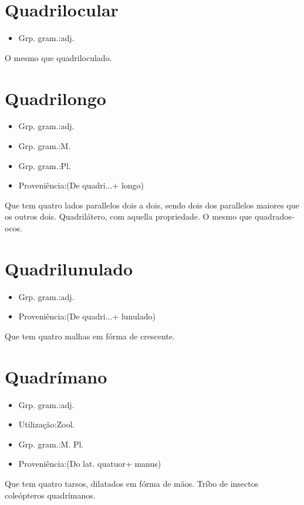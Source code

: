 \section{Quadrilocular}
\begin{itemize}
\item {Grp. gram.:adj.}
\end{itemize}
O mesmo que \textunderscore quadriloculado\textunderscore .
\section{Quadrilongo}
\begin{itemize}
\item {Grp. gram.:adj.}
\end{itemize}
\begin{itemize}
\item {Grp. gram.:M.}
\end{itemize}
\begin{itemize}
\item {Grp. gram.:Pl.}
\end{itemize}
\begin{itemize}
\item {Proveniência:(De \textunderscore quadri...\textunderscore  + \textunderscore longo\textunderscore )}
\end{itemize}
Que tem quatro lados parallelos dois a dois, sendo dois dos parallelos maiores que os outros dois.
Quadrilátero, com aquella propriedade.
O mesmo que \textunderscore quadrados-ocos\textunderscore .
\section{Quadrilunulado}
\begin{itemize}
\item {Grp. gram.:adj.}
\end{itemize}
\begin{itemize}
\item {Proveniência:(De \textunderscore quadri...\textunderscore  + \textunderscore lunulado\textunderscore )}
\end{itemize}
Que tem quatro malhas em fórma de crescente.
\section{Quadrímano}
\begin{itemize}
\item {Grp. gram.:adj.}
\end{itemize}
\begin{itemize}
\item {Utilização:Zool.}
\end{itemize}
\begin{itemize}
\item {Grp. gram.:M. Pl.}
\end{itemize}
\begin{itemize}
\item {Proveniência:(Do lat. \textunderscore quatuor\textunderscore  + \textunderscore manus\textunderscore )}
\end{itemize}
Que tem quatro tarsos, dilatados em fórma de mãos.
Tríbo de insectos coleópteros quadrímanos.
